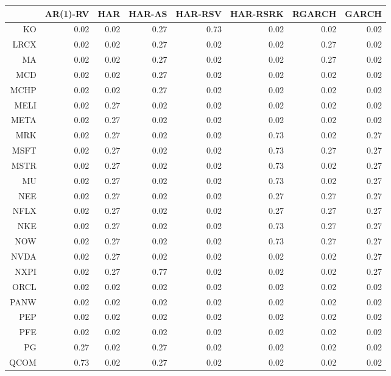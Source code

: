 \begin{table}[ht]
\centering
\begin{tabular}{rrrrrrrr}
  \hline
 & AR(1)-RV & HAR & HAR-AS & HAR-RSV & HAR-RSRK & RGARCH & GARCH \\ 
  \hline
KO & 0.02 & 0.02 & 0.27 & 0.73 & 0.02 & 0.02 & 0.02 \\ 
  LRCX & 0.02 & 0.02 & 0.27 & 0.02 & 0.02 & 0.27 & 0.02 \\ 
  MA & 0.02 & 0.02 & 0.27 & 0.02 & 0.02 & 0.27 & 0.02 \\ 
  MCD & 0.02 & 0.02 & 0.27 & 0.02 & 0.02 & 0.02 & 0.02 \\ 
  MCHP & 0.02 & 0.02 & 0.27 & 0.02 & 0.02 & 0.02 & 0.02 \\ 
  MELI & 0.02 & 0.27 & 0.02 & 0.02 & 0.02 & 0.02 & 0.02 \\ 
  META & 0.02 & 0.27 & 0.02 & 0.02 & 0.02 & 0.02 & 0.02 \\ 
  MRK & 0.02 & 0.27 & 0.02 & 0.02 & 0.73 & 0.02 & 0.27 \\ 
  MSFT & 0.02 & 0.27 & 0.02 & 0.02 & 0.73 & 0.27 & 0.27 \\ 
  MSTR & 0.02 & 0.27 & 0.02 & 0.02 & 0.73 & 0.02 & 0.27 \\ 
  MU & 0.02 & 0.27 & 0.02 & 0.02 & 0.73 & 0.02 & 0.27 \\ 
  NEE & 0.02 & 0.27 & 0.02 & 0.02 & 0.27 & 0.27 & 0.27 \\ 
  NFLX & 0.02 & 0.27 & 0.02 & 0.02 & 0.27 & 0.27 & 0.27 \\ 
  NKE & 0.02 & 0.27 & 0.02 & 0.02 & 0.73 & 0.27 & 0.27 \\ 
  NOW & 0.02 & 0.27 & 0.02 & 0.02 & 0.73 & 0.27 & 0.27 \\ 
  NVDA & 0.02 & 0.27 & 0.02 & 0.02 & 0.02 & 0.02 & 0.27 \\ 
  NXPI & 0.02 & 0.27 & 0.77 & 0.02 & 0.02 & 0.02 & 0.27 \\ 
  ORCL & 0.02 & 0.02 & 0.02 & 0.02 & 0.02 & 0.02 & 0.02 \\ 
  PANW & 0.02 & 0.02 & 0.02 & 0.02 & 0.02 & 0.02 & 0.02 \\ 
  PEP & 0.02 & 0.02 & 0.02 & 0.02 & 0.02 & 0.02 & 0.02 \\ 
  PFE & 0.02 & 0.02 & 0.02 & 0.02 & 0.02 & 0.02 & 0.02 \\ 
  PG & 0.27 & 0.02 & 0.27 & 0.02 & 0.02 & 0.02 & 0.02 \\ 
  QCOM & 0.73 & 0.02 & 0.27 & 0.02 & 0.02 & 0.02 & 0.02 \\ 

\end{tabular}
\end{table}
